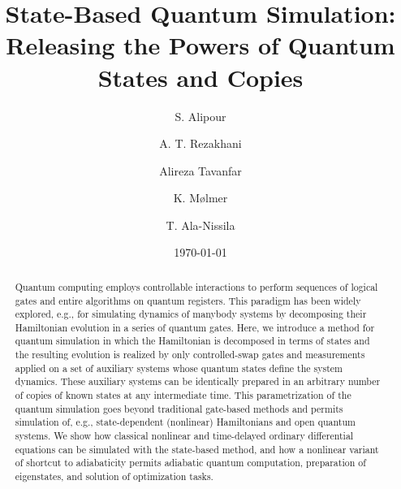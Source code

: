 \documentclass[aps,pra,twocolumn,floatfix,groupedaddress,superscriptaddress,nofootinbib,notitlepage]{revtex4-2}
\begin{document}
\title{State-Based Quantum Simulation: Releasing the Powers of Quantum States and Copies}

\author{S. Alipour}

\author{A. T. Rezakhani}

\author{Alireza Tavanfar}

\author{K. M{\o}lmer}

\author{T. Ala-Nissila}

\begin{abstract}
Quantum computing employs controllable interactions to perform sequences of logical gates and entire algorithms on quantum registers. This paradigm has been widely explored, e.g., for simulating dynamics of manybody systems by decomposing their Hamiltonian evolution in a series of quantum gates. Here, we introduce a method for quantum simulation in which the Hamiltonian is decomposed in terms of states and the resulting evolution is realized by only controlled-swap gates and measurements applied on a set of auxiliary systems whose quantum states define the system dynamics. These auxiliary systems can be identically prepared in an arbitrary number of copies of known states at any intermediate time. This parametrization of the quantum simulation goes beyond traditional gate-based methods and permits simulation of, e.g., state-dependent (nonlinear) Hamiltonians and open quantum systems. We show how classical nonlinear and time-delayed ordinary differential equations can be simulated with the state-based method, and how a nonlinear variant of shortcut to adiabaticity permits adiabatic quantum computation, preparation of eigenstates, and solution of optimization tasks.
\end{abstract}
\date{\today}
\maketitle
\end{document}
